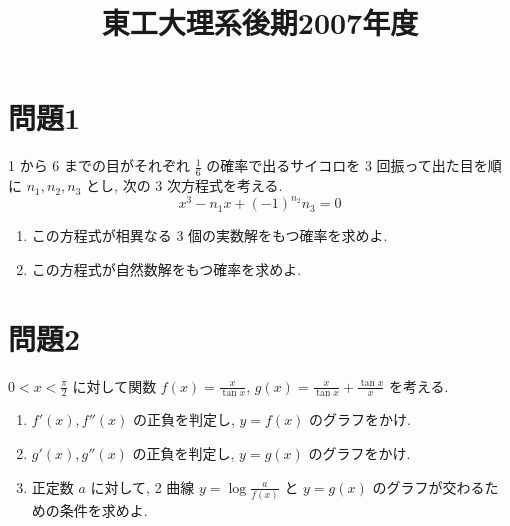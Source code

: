\documentclass[unicode,12pt, a4paper]{ltjsarticle}%
\title{東工大理系後期2007年度}
\begin{document}
\maketitle
\section{問題1}
1 から 6 までの目がそれぞれ $\frac{1}{6}$ の確率で出るサイコロを 3 回振って出た目を順に
$n_1, n_2, n_3$ とし, 次の 3 次方程式を考える.
$$ x^3 - n_1 x + (-1)^{n_2} n_3 = 0 $$
\begin{enumerate}
    \item この方程式が相異なる 3 個の実数解をもつ確率を求めよ.
    \item この方程式が自然数解をもつ確率を求めよ.
\end{enumerate}


\section{問題2}
$0 < x < \frac{\pi}{2}$ に対して関数 $f(x) = \frac{x}{\tan x}$, $g(x) = \frac{x}{\tan x} + \frac{\tan x}{x}$ を考える.
\begin{enumerate}
    \item $f'(x), f''(x)$ の正負を判定し, $y=f(x)$ のグラフをかけ.
    \item $g'(x), g''(x)$ の正負を判定し, $y=g(x)$ のグラフをかけ.
    \item 正定数 $a$ に対して, 2 曲線 $y = \log \frac{a}{f(x)}$ と $y=g(x)$ のグラフが交わるための条件を求めよ.
\end{enumerate}
\end{document}
